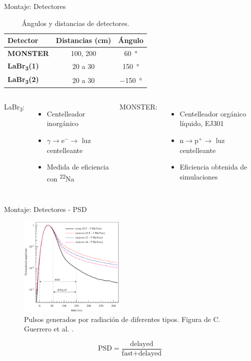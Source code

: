 \documentclass[11pt]{beamer}
\newcommand{\Na}{\textsuperscript{22}Na }
\begin{document}
\begin{frame}{Montaje: Detectores}
	\begin{table}[H]
		\centering
		\begin{tabular}[c]{>{\bfseries}l||c|c}
			Detector                & Distancias (\unit{\cm})& Ángulo\\ \hline
			\textbf{MONSTER}        &\num{100}, \num{200}           &\qty{60}{\degree}      \\ \hline
			\textbf{LaBr\textsubscript{3}(1)}               &\num{20} a \num{30}           &\qty{150}{\degree}     \\ \hline
			\textbf{LaBr\textsubscript{3}(2)}               &\num{20} a \num{30}           &\qty{-150}{\degree}    \\ \hline
		\end{tabular}
		\caption{Ángulos y distancias de detectores.}
		\label{distances_angles_table}
	\end{table}
	\begin{columns}
	LaBr\textsubscript{3}:
	\begin{itemize}
		\item Centelleador inorgánico
		\item $\gamma\longrightarrow\text{e}^-\longrightarrow$ luz centelleante
		\item Medida de eficiencia con \Na
	\end{itemize}
	MONSTER:
	\begin{itemize}
		\item Centelleador orgánico líquido, EJ301
		\item $\text{n}\longrightarrow\text{p}^+\longrightarrow$ luz centelleante
		\item Eficiencia obtenida de simulaciones
	\end{itemize}
	\end{columns}
\end{frame}

\begin{frame}{Montaje: Detectores - PSD}
	\begin{figure}[H]
		\centering
		\includegraphics[width=0.45\textwidth]{psd_explanation.png}
		\caption{Pulsos generados por radiación de diferentes tipos. Figura de C. Guerrero et al. \cite{guerrero2008}.}
		\label{}
	\end{figure}
	\begin{equation}
		\text{PSD} = \frac{\text{delayed}}{\text{fast}+\text{delayed}}
	\end{equation}
\end{frame}
\end{document}
